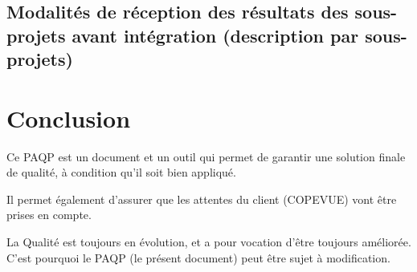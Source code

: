 \documentclass[a4paper]{article}
\begin{document}
\subsection{Modalités de réception des résultats des sous-projets avant intégration (description par sous-projets)}

\section{Conclusion}

Ce PAQP est un document et un outil qui permet de garantir une solution finale de qualité, à condition qu'il soit bien appliqué.

Il permet également d'assurer que les attentes du client (COPEVUE) vont être prises en compte.

La Qualité est toujours en évolution, et a pour vocation d'être toujours améliorée. C'est pourquoi le PAQP (le présent document) peut être sujet à modification.
\end{document}
